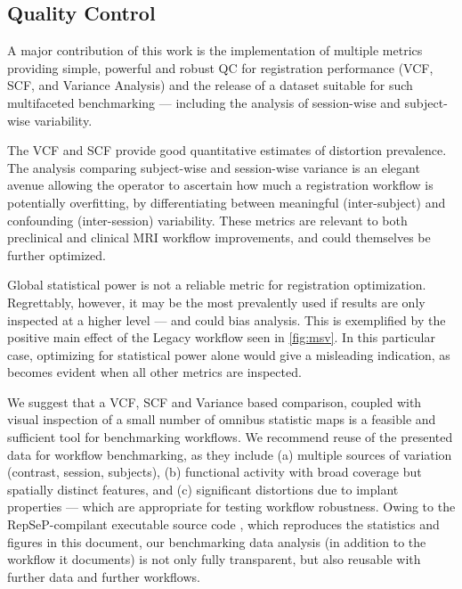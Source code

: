 \subsection{Quality Control}

A major contribution of this work is the implementation of multiple metrics providing simple, powerful and robust QC for registration performance (VCF, SCF, and Variance Analysis) and the release of a dataset \cite{irsabi_bidsdata} suitable for such multifaceted benchmarking --- including the analysis of session-wise and subject-wise variability.

The VCF and SCF provide good quantitative estimates of distortion prevalence.
The analysis comparing subject-wise and session-wise variance is an elegant avenue allowing the operator to ascertain how much a registration workflow is potentially overfitting, by differentiating between meaningful (inter-subject) and confounding (inter-session) variability.
These metrics are relevant to both preclinical and clinical MRI workflow improvements, and could themselves be further optimized.

Global statistical power is not a reliable metric for registration optimization.
Regrettably, however, it may be the most prevalently used if results are only inspected at a higher level --- and could bias analysis.
This is exemplified by the positive main effect of the Legacy workflow seen in \cref{fig:msv}.
In this particular case, optimizing for statistical power alone would give a misleading indication, as becomes evident when all other metrics are inspected.

We suggest that a VCF, SCF and Variance based comparison, coupled with visual inspection of a small number of omnibus statistic maps is a feasible and sufficient tool for benchmarking workflows.
We recommend reuse of the presented data for workflow benchmarking, as they include (a) multiple sources of variation (contrast, session, subjects), (b) functional activity with broad coverage but spatially distinct features, and (c) significant distortions due to implant properties --- which are appropriate for testing workflow robustness.
Owing to the RepSeP-compilant executable source code \cite{source}, which reproduces the statistics and figures in this document, our benchmarking data analysis (in addition to the workflow it documents) is not only fully transparent, but also reusable with further data and further workflows.

